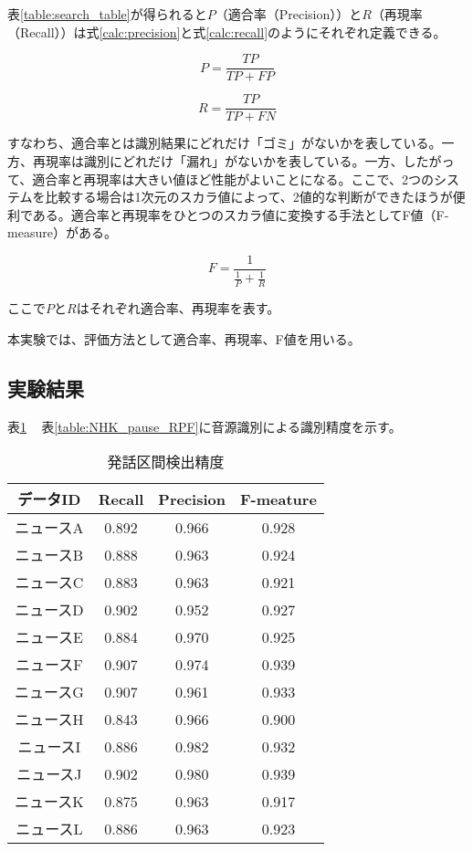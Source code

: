 表\ref{table:search_table}が得られると$P$（適合率（Precision））と$R$（再現率（Recall））は式\ref{calc:precision}と式\ref{calc:recall}のようにそれぞれ定義できる。

\begin{equation}
\label{calc:precision}
P = \frac{TP}{TP + FP}
\end{equation}

\begin{equation}
\label{calc:recall}
R = \frac{TP}{TP + FN}
\end{equation}

すなわち、適合率とは識別結果にどれだけ「ゴミ」がないかを表している。一方、再現率は識別にどれだけ「漏れ」がないかを表している。一方、したがって、適合率と再現率は大きい値ほど性能がよいことになる。ここで、2つのシステムを比較する場合は1次元のスカラ値によって、2値的な判断ができたほうが便利である。適合率と再現率をひとつのスカラ値に変換する手法としてF値（F-measure）がある。

\begin{equation}
\label{calc:fmeasure}
F = \frac{1}{\frac{1}{P} + \frac{1}{R}}
\end{equation}

ここで$P$と$R$はそれぞれ適合率、再現率を表す。\par
本実験では、評価方法として適合率、再現率、F値を用いる。
\subsection{実験結果}
表\ref{table:NHK_speach_RPF} ~ 表\ref{table:NHK_pause_RPF}に音源識別による識別精度を示す。
\begin{table}[H]
  \begin{center}
    \caption{発話区間検出精度 \label{table:NHK_speach_RPF}}
    \begin{tabular}{|c||c|c|c|} \hline
データID & Recall & Precision & F-meature \\ \hline
ニュースA & 0.892 & 0.966 & 0.928 \\ \hline
ニュースB & 0.888 & 0.963 & 0.924 \\ \hline
ニュースC & 0.883 & 0.963 & 0.921 \\ \hline
ニュースD & 0.902 & 0.952 & 0.927 \\ \hline
ニュースE & 0.884 & 0.970 & 0.925 \\ \hline
ニュースF & 0.907 & 0.974 & 0.939 \\ \hline
ニュースG & 0.907 & 0.961 & 0.933 \\ \hline
ニュースH & 0.843 & 0.966 & 0.900 \\ \hline
ニュースI & 0.886 & 0.982 & 0.932 \\ \hline
ニュースJ & 0.902 & 0.980 & 0.939 \\ \hline
ニュースK & 0.875 & 0.963 & 0.917 \\ \hline
ニュースL & 0.886 & 0.963 & 0.923 \\ \hline
    \end{tabular}
  \end{center}
\end{table}

